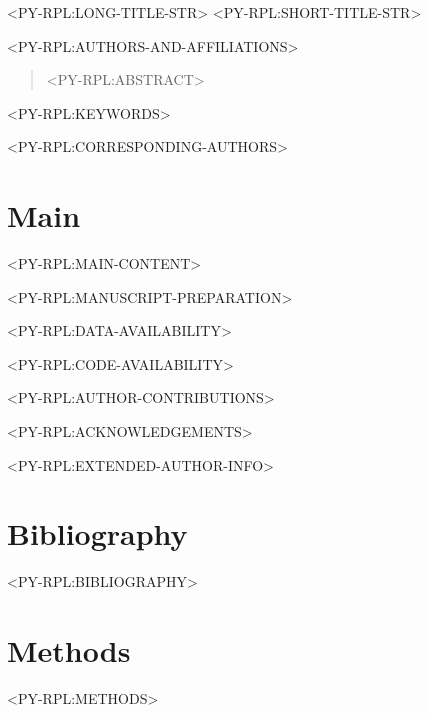 \documentclass[times, twoside]{rxiv_maker_style}
\begin{document}
<PY-RPL:LONG-TITLE-STR>
<PY-RPL:SHORT-TITLE-STR>

<PY-RPL:AUTHORS-AND-AFFILIATIONS>

\maketitle

\begin{abstract}

<PY-RPL:ABSTRACT>

\end{abstract}

<PY-RPL:KEYWORDS>

<PY-RPL:CORRESPONDING-AUTHORS>

\section*{Main}
<PY-RPL:MAIN-CONTENT>

\vspace{1em}

\begin{manuscriptprep}
<PY-RPL:MANUSCRIPT-PREPARATION>
\end{manuscriptprep}

\begin{data}
<PY-RPL:DATA-AVAILABILITY>
\end{data}

\begin{code}
<PY-RPL:CODE-AVAILABILITY>
\end{code}

\begin{contributions}
<PY-RPL:AUTHOR-CONTRIBUTIONS>
\end{contributions}

\begin{acknowledgements}
<PY-RPL:ACKNOWLEDGEMENTS>
\end{acknowledgements}

\begin{exauthor}
<PY-RPL:EXTENDED-AUTHOR-INFO>
\end{exauthor}

\section*{Bibliography}
<PY-RPL:BIBLIOGRAPHY>

\section*{Methods}
<PY-RPL:METHODS>

\onecolumn
\newpage




\end{document}
